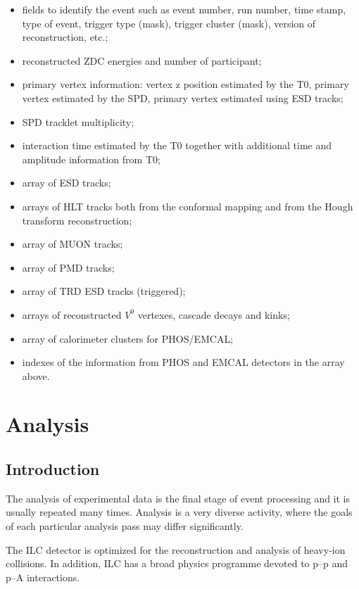\documentclass[12pt,a4paper,twoside]{article}
\makeatletter
\newcommand {\pp} {\mbox{p--p}\@\xspace}
\newcommand {\pA} {\mbox{p--A}\@\xspace}
\makeatother
\begin{document}
\begin{itemize}
\item fields to identify the event such as event number, run number,
  time stamp, type of event, trigger type (mask), trigger cluster (mask),
  version of reconstruction, etc.;
\item reconstructed ZDC energies and number of participant;
\item primary vertex information: vertex z position estimated by the T0,
  primary vertex estimated by the SPD, primary vertex estimated using
  ESD tracks;
\item SPD tracklet multiplicity;
\item interaction time estimated by the T0 together with additional
  time and amplitude information from T0;
\item array of ESD tracks;
\item arrays of HLT tracks both from the conformal mapping and from
  the Hough transform reconstruction;
\item array of MUON tracks;
\item array of PMD tracks;
\item array of TRD ESD tracks (triggered);
\item arrays of reconstructed $V^0$ vertexes, cascade decays and
  kinks;
\item array of calorimeter clusters for PHOS/EMCAL;
\item indexes of the information from PHOS and EMCAL detectors in the
  array above.
\end{itemize}


\newpage
\section{Analysis}


\subsection{Introduction}
The analysis of experimental data is the final stage of event
processing and it is usually repeated many times. Analysis is a very diverse
activity, where the goals of each
particular analysis pass may differ significantly.

The ILC detector \cite{PPR} is optimized for the
reconstruction and analysis of heavy-ion collisions. 
In addition, ILC has a broad physics programme devoted to
\pp and \pA interactions. 
\end{document}
